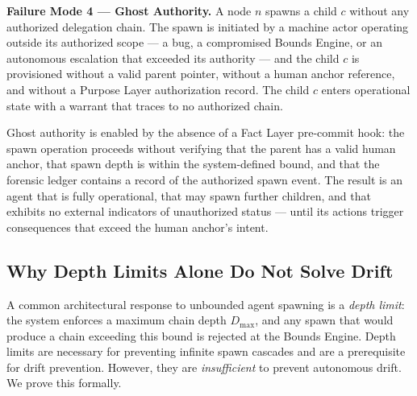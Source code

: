 \medskip
\noindent\textbf{Failure Mode 4 — Ghost Authority.}
A node $n$ spawns a child $c$ without any authorized delegation chain. The spawn is initiated by a machine actor operating outside its authorized scope — a bug, a compromised Bounds Engine, or an autonomous escalation that exceeded its authority — and the child $c$ is provisioned without a valid parent pointer, without a human anchor reference, and without a Purpose Layer authorization record. The child $c$ enters operational state with a warrant that traces to no authorized chain.

Ghost authority is enabled by the absence of a Fact Layer pre-commit hook: the spawn operation proceeds without verifying that the parent has a valid human anchor, that spawn depth is within the system-defined bound, and that the forensic ledger contains a record of the authorized spawn event. The result is an agent that is fully operational, that may spawn further children, and that exhibits no external indicators of unauthorized status — until its actions trigger consequences that exceed the human anchor's intent.

\subsection{Why Depth Limits Alone Do Not Solve Drift}
\label{sec:rs-drift-depth-limits}

A common architectural response to unbounded agent spawning is a \emph{depth limit}: the system enforces a maximum chain depth $D_{\max}$, and any spawn that would produce a chain exceeding this bound is rejected at the Bounds Engine. Depth limits are necessary for preventing infinite spawn cascades and are a prerequisite for drift prevention. However, they are \emph{insufficient} to prevent autonomous drift. We prove this formally.

